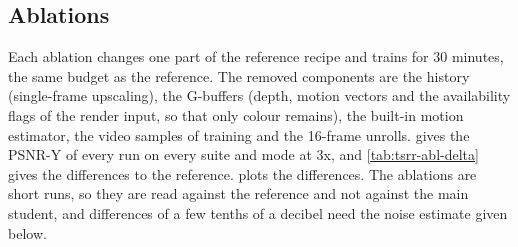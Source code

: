 \subsection{Ablations}\label{sec:tsrr-ablation}

Each ablation changes one part of the reference recipe and trains for 30 minutes, the same budget as the reference. The removed components are the history (single-frame upscaling), the G-buffers (depth, motion vectors and the availability flags of the render input, so that only colour remains), the built-in motion estimator, the video samples of training and the 16-frame unrolls.  gives the PSNR-Y of every run on every suite and mode at 3x, and \cref{tab:tsrr-abl-delta} gives the differences to the reference.  plots the differences. The ablations are short runs, so they are read against the reference and not against the main student, and differences of a few tenths of a decibel need the noise estimate given below.

